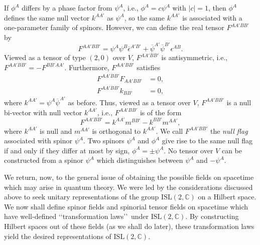 If \(\phi^A\) differs by a phase factor from \(\psi^A\), i.e.,
\(\phi^A=c\psi^A\) with \(\lvert c\rvert=1\), then \(\phi^A\) defines the same null
vector \(k^{AA'}\) as \(\psi^A\), so the same \(k^{AA'}\) is associated with a
one-parameter family of spinors. However, we can define the real tensor
\(F^{AA'BB'}\) by
\begin{equation}
  F^{AA'BB'}=\psi^A\psi^B\overline\epsilon^{A'B'}
    +\overline\psi^{A'}\overline\psi^{B'}\epsilon^{AB}.
  \tag{13.1.37}\label{eq:13.1.37}
\end{equation}
Viewed as a tensor of type \((2,0)\) over \(V\), \(F^{AA'BB'}\) is antisymmetric,
i.e., \(F^{AA'BB'}=-F^{BB'AA'}\). Furthermore, \(F^{AA'BB'}\) satisfies
\begin{align}
  F^{AA'BB'}F_{AA'BB'}&=0,
  \tag{13.1.38}\label{eq:13.1.38}\\
  F^{AA'BB'}k_{BB'}&=0,
  \tag{13.1.39}\label{eq:13.1.39}
\end{align}
where \(k^{AA'}=\psi^A\overline\psi^{A'}\) as before. Thus, viewed as a tensor over
\(V\), \(F^{AA'BB'}\) is a null bi-vector with null vector \(k^{AA'}\), i.e.,
\(F^{AA'BB'}\) is of the form
\begin{equation}
  F^{AA'BB'}=k^{AA'}m^{BB'}-k^{BB'}m^{AA'},
  \tag{13.1.40}\label{eq:13.1.40}
\end{equation}
where \(k^{AA'}\) is null and \(m^{AA'}\) is orthogonal to \(k^{AA'}\). We call
\(F^{AA'BB'}\) the \emph{null flag} associated with spinor \(\psi^A\). Two spinors
\(\psi^A\) and \(\phi^A\) give rise to the same null flag if and only if they differ
at most by sign, \(\phi^A=\pm\psi^A\). No tensor over \(V\) can be constructed from a
spinor \(\psi^A\) which distinguishes between \(\psi^A\) and \(-\psi^A\).

We return, now, to the general issue of obtaining the possible fields on spacetime
which may arise in quantum theory. We were led by the considerations discussed above
to seek unitary representations of the group \(\mathrm{ISL}(2,\mathbb C)\) on a
Hilbert space. We now shall define spinor fields and spinorial tensor fields on
spacetime which have well-defined \lq\lq transformation laws\rq\rq\ under
\(\mathrm{ISL}(2,\mathbb C)\). By constructing Hilbert spaces out of these fields (as
we shall do later), these transformation laws yield the desired representations of
\(\mathrm{ISL}(2,\mathbb C)\).

